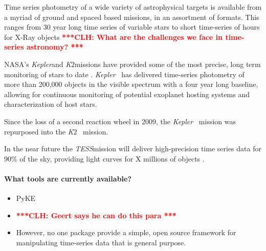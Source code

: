 \documentclass[twocolumn]{aastex62}
\newcommand{\ktwo}{{\it K$\mathit{2}$}}
\newcommand{\tess}{{\it TESS}}
\newcommand{\kepler}{{\it Kepler}}
\newcommand{\clh}[1]{\textcolor{red}{ \textbf{***CLH: #1 ***}}}
\begin{document}
Time series photometry of a wide variety of astrophysical targets is available from a
myriad of ground and spaced based missions, in an assortment of formats. This ranges
from 30 year long time series of variable stars\cite{citationneeded} to short
time-series of hours for X-Ray objects
\clh{What are the challenges we face in time-series astronomy?}

NASA's \kepler and \ktwo missions have provided some of the most precise,
long term monitoring of stars to date \cite{citationneeded}. \kepler~ has delivered
time-series photometry of more than 200,000 objects in the visible spectrum with a four
year long baseline, allowing for continuous monitoring of potential exoplanet hosting
systems and characterization of host stars.

Since the loss of a second reaction wheel in 2009, the \kepler~ mission was repurposed
into the \ktwo~ mission.

In the near future the \tess mission will deliver high-precision time series data for
90\% of the sky, providing light curves for X millions of objects \cite{citationneeded}.

\paragraph{What tools are currently available?}
\begin{itemize}
\item PyKE
\item \clh{Geert says he can do this para}
\item However, no one package provide a simple, open source framework for manipulating time-series data that is general purpose.
\end{itemize}
\end{document}
